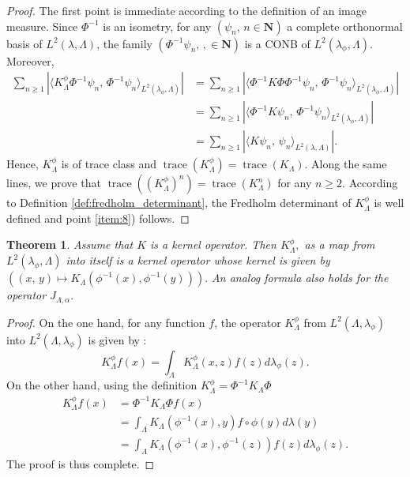 \documentclass[11pt,a4paper]{amsart}
\newtheorem{Theorem}{Theorem}
\begin{document}
\begin{proof}
  The first point is immediate according to the definition of an image
  measure.  Since $\Phi^{-1}$ is an isometry, for any $(\psi_n, \,
  n\in {{\mathbf N}})$ a complete orthonormal basis of $L^2(\lambda, \Lambda)$,
  the family $(\Phi^{-1}\psi_n,\, ,\in {{\mathbf N}})$ is a CONB of
  $L^2(\lambda_{\phi}, \Lambda)$. Moreover,
  \begin{align*}
    \sum_{n\ge 1} \left|\langle K^{\phi}_{\Lambda} \Phi^{-1}\psi_n,\,
      \Phi^{-1}\psi_n
      \rangle_{L^2(\lambda_{\phi}, \Lambda)}\right|&= \sum_{n\ge 1} \left|\langle \Phi^{-1} K \Phi \Phi^{-1}\psi_n,\, \Phi^{-1}\psi_n\rangle_{L^2(\lambda_{\phi}, \Lambda)}\right|\\
    &=\sum_{n\ge 1} \left|\langle \Phi^{-1} K\psi_n,\, \Phi^{-1}\psi_n\rangle_{L^2(\lambda_{\phi}, \Lambda)}\right|\\
    &=\sum_{n\ge 1} \left|\langle K \psi_n,\,
      \psi_n\rangle_{L^2(\lambda, \Lambda)}\right|.
  \end{align*}
  Hence, $K^{\phi}_\Lambda$ is of trace class and
  ${\operatorname{trace}}(K^{\phi}_\Lambda)={\operatorname{trace}}(K_\Lambda)$.  Along the same lines, we
  prove that $ {\operatorname{trace}}((K^{\phi}_\Lambda)^n)={\operatorname{trace}}(K_\Lambda^n)$ for any
  $n\ge 2.$ According to Definition \ref{def:fredholm_determinant},
  the Fredholm determinant of $K^\phi_{\Lambda}$ is well defined and
  point \ref{item:8}) follows.
\end{proof}
\begin{Theorem}
  \label{thm:kernel_form}
  Assume that $K$ is a kernel operator.  Then $K^{\phi}_{\Lambda},$ as
  a map from $L^2(\lambda_{\phi},\Lambda)$ into itself is a kernel
  operator whose kernel is given by $((x,\, y)\mapsto
  K_{\Lambda}(\phi^{-1}(x),\phi^{-1}(y))).$ An analog formula also
  holds for the operator $J_{\Lambda,\alpha}.$
\end{Theorem}
\begin{proof}
  On the one hand, for any function $f$, the operator
  $K^{\phi}_{\Lambda}$ from $L^2(\Lambda,\lambda_{\phi})$ into
  $L^2(\Lambda,\lambda_{\phi})$ is given by :
  \begin{equation*}
    K^{\phi}_{\Lambda}f(x)=\int_{\Lambda}K^{\phi}_{\Lambda}(x,z)f(z)d\lambda_{\phi}(z).
  \end{equation*}
  On the other hand, using the definition
  $K^{\phi}_{\Lambda}=\Phi^{-1}K_{\Lambda}\Phi$
  \begin{align*}
    K^{\phi}_{\Lambda}f(x)&=\Phi^{-1}K_{\Lambda}\Phi f(x)\\
    &=\int_{\Lambda}K_{\Lambda}(\phi^{-1}(x),y) f\circ \phi(y)d\lambda(y)\\
    &=\int_{\Lambda}K_{\Lambda}(\phi^{-1}(x),\phi^{-1}(z))
    f(z)d\lambda_{\phi}(z).
  \end{align*}
  The proof is thus complete.
\end{proof}
\end{document}

